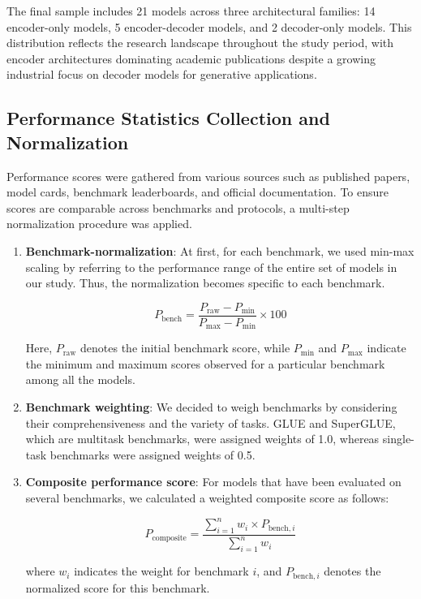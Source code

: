 \documentclass[preprint,12pt]{elsarticle}
\begin{document}
The final sample includes 21 models across three architectural families: 14 encoder-only models, 5 encoder-decoder models, and 2 decoder-only models. This distribution reflects the research landscape throughout the study period, with encoder architectures dominating academic publications despite a growing industrial focus on decoder models for generative applications.

\subsection{Performance Statistics Collection and Normalization}

Performance scores were gathered from various sources such as published papers, model cards, benchmark leaderboards, and official documentation. To ensure scores are comparable across benchmarks and protocols, a multi-step normalization procedure was applied.

\begin{enumerate}
   \item \textbf{Benchmark-normalization}: At first, for each benchmark, we used min-max scaling by referring to the performance range of the entire set of models in our study. Thus, the normalization becomes specific to each benchmark.

   \[P_{\text{bench}} = \frac{P_{\text{raw}} - P_{\text{min}}}{P_{\text{max}} - P_{\text{min}}} \times 100\]

   Here, $P_{\text{raw}}$ denotes the initial benchmark score, while $P_{\text{min}}$ and $P_{\text{max}}$ indicate the minimum and maximum scores observed for a particular benchmark among all the models.

   \item \textbf{Benchmark weighting}: We decided to weigh benchmarks by considering their comprehensiveness and the variety of tasks. GLUE and SuperGLUE, which are multitask benchmarks, were assigned weights of 1.0, whereas single-task benchmarks were assigned weights of 0.5.

   \item  \textbf{Composite performance score}: For models that have been evaluated on several benchmarks, we calculated a weighted composite score as follows:

   \[P_{\text{composite}} = \frac{\sum_{i=1}^{n} w_i \times P_{\text{bench}, i}}{\sum_{i=1}^{n} w_i}\]

   where $w_i$ indicates the weight for benchmark $i$, and $P_{\text{bench}, i}$ denotes the normalized score for this benchmark.
\end{enumerate}
\end{document}
